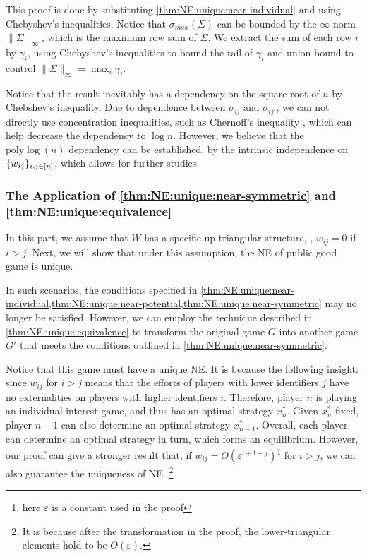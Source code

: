 \begin{remark*}
\label{rmk:thm:case:eg}

This proof is done by substituting \cref{thm:NE:unique:near-individual} and using Chebyshev's inequalities. Notice that $\sigma_{max}(\Sigma)$ can be bounded by the $\infty$-norm $\| \Sigma \|_\infty$, which is the maximum row sum of $\Sigma$.
We extract the sum of each row $i$ by $\gamma_i$, using Chebyshev's inequalities to bound the tail of $\gamma_i$ and union bound to control $\| \Sigma \|_\infty = \max_i \gamma_i$.

Notice that the result inevitably has a dependency on the square root of $n$ by Chebshev's inequality. 
Due to dependence between $\sigma_{ij}$ and $\sigma_{ij'}$, we can not directly use concentration inequalities, such as Chernoff's inequality \citep{chernoff:chernoff1952measure}, which can help decrease the dependency to $\log n$. 
However, we believe that the $\mathrm{poly} \log(n)$ dependency can be established, by the intrinsic independence on $\{w_{ij}\}_{i,j\in[n]}$, which allows for further studies.

\end{remark*}

\subsubsection{The Application of \cref{thm:NE:unique:near-symmetric} and \cref{thm:NE:unique:equivalence}}

In this part, we assume that $W$ has a specific up-triangular structure, \ie, $w_{ij} = 0$ if $i>j$. Next, we will show that under this assumption, the NE of public good game is unique.





\begin{remark*}
In such scenarios, the conditions specified in \cref{thm:NE:unique:near-individual,thm:NE:unique:near-potential,thm:NE:unique:near-symmetric} may no longer be satisfied. However, we can employ the technique described in \cref{thm:NE:unique:equivalence} to transform the original game $G$ into another game $G'$
that meets the conditions outlined in \cref{thm:NE:unique:near-symmetric}.

Notice that this game must have a unique NE. It is because the following insight: since $w_{ij} $ for $i>j$ means that the efforts of players with lower identifiers $j$ have no externalities on players with higher identifiers $i$. Therefore, player $n$ is playing an individual-interest game, and thus has an optimal strategy $x_n^*$. Given $x_n^*$ fixed, player $n-1$ can also determine an optimal strategy $x_{n-1}^*$. Overall, each player can determine an optimal strategy in turn, which forms an equilibrium. 
However, our proof can give a stronger result that, if $w_{ij} = O(\varepsilon^{i+1-j})$\footnote{here $\varepsilon$ is a constant used in the proof} for $i>j$, we can also guarantee the uniqueness of NE.
\footnote{It is because after the transformation in the proof, the lower-triangular elements hold to be $O(\varepsilon)$.}

\end{remark*}


